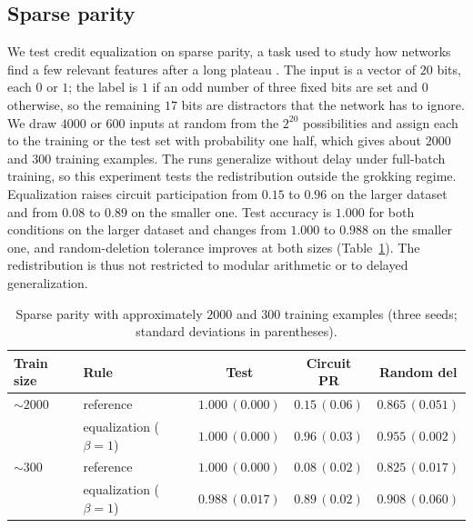\documentclass{article} %
\begin{document}
\subsection{Sparse parity}
\label{app:parity}
We test credit equalization on sparse parity, a task used to study how networks find a few relevant features after a long plateau \citep{barak2022hidden}. The input is a vector of $20$ bits, each $0$ or $1$; the label is $1$ if an odd number of three fixed bits are set and $0$ otherwise, so the remaining $17$ bits are distractors that the network has to ignore. We draw $4000$ or $600$ inputs at random from the $2^{20}$ possibilities and assign each to the training or the test set with probability one half, which gives about $2000$ and $300$ training examples. The runs generalize without delay under full-batch training, so this experiment tests the redistribution outside the grokking regime. Equalization raises circuit participation from $0.15$ to $0.96$ on the larger dataset and from $0.08$ to $0.89$ on the smaller one. Test accuracy is $1.000$ for both conditions on the larger dataset and changes from $1.000$ to $0.988$ on the smaller one, and random-deletion tolerance improves at both sizes (Table~\ref{tab:parity}). The redistribution is thus not restricted to modular arithmetic or to delayed generalization.

\begin{table}[!ht]
\caption{Sparse parity with approximately $2000$ and $300$ training examples (three seeds; standard deviations in parentheses).}
\label{tab:parity}
\begin{center}
\small
\begin{tabular}{llccc}
\toprule
Train size & Rule & Test & Circuit PR & Random del \\
\midrule
$\sim 2000$ & reference & $1.000\,(0.000)$ & $0.15\,(0.06)$ & $0.865\,(0.051)$ \\
            & equalization ($\beta{=}1$) & $1.000\,(0.000)$ & $0.96\,(0.03)$ & $0.955\,(0.002)$ \\
\midrule
$\sim 300$  & reference & $1.000\,(0.000)$ & $0.08\,(0.02)$ & $0.825\,(0.017)$ \\
            & equalization ($\beta{=}1$) & $0.988\,(0.017)$ & $0.89\,(0.02)$ & $0.908\,(0.060)$ \\
\bottomrule
\end{tabular}
\end{center}
\end{table}
\end{document}
